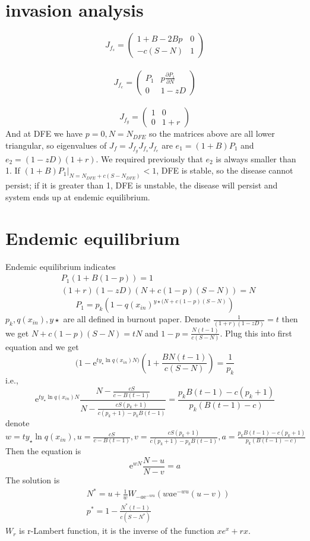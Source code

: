 \documentclass[12pt]{article}
\begin{document}
\section{invasion analysis}
$$
    J_{f_s}=\begin{pmatrix}
    1+B-2Bp&0\\-c(S-N)&1
\end{pmatrix}
$$\\
$$
    J_{f_e}=\begin{pmatrix}
P_1&p\frac{\partial P_1}{\partial N}\\0&1-zD
\end{pmatrix}$$
\\
$$
    J_{f_g}=\begin{pmatrix}
1&0\\0&1+r
\end{pmatrix}
$$
And at DFE we have $p=0,N=N_{DFE}$ so the matrices above are all lower triangular, so eigenvalues of $J_f=J_{f_g}J_{f_s}J_{f_e}$ 
are $e_1=(1+B)P_1$ and $e_2=(1-zD)(1+r)$. We required previously that $e_2$ is always smaller than 1. If $(1+B)P_1|_{N=N_{DFE}+c(S-N_{DFE})}<1$, DFE is stable, so the disease cannot persist; if it is greater than 1, DFE is unstable, the disease will persist and system ends up at endemic equilibrium.

\section{Endemic equilibrium}
Endemic equilibrium indicates
\begin{align*}
    &P_1(1+B(1-p))=1\\
    &(1+r)(1-zD)(N+c(1-p)(S-N))=N
\end{align*}
$$P_1=p_k(1-q(x_{in})^{y \star(N+c(1-p)(S-N)})$$
$p_k,q(x_{in}),y \star$ are all defined in burnout paper. Denote $\frac{1}{(1+r)(1-zD)}=t$ then we get $N+c(1-p)(S-N)=tN$ and $1-p=\frac{N(t-1)}{c(S-N)}$. Plug this into first equation and we get
$$(1-\mathrm{e}^{ty_\star \ln q(x_{in})N)}(1+\frac{BN(t-1)}{c(S-N)})=\frac{1}{p_k}$$
i.e.,
$$\mathrm{e}^{ty_\star \ln q(x_{in})N}\frac{N-\frac{cS}{c-B(t-1)}}{N-\frac{cS(p_k+1)}{c(p_k+1)-p_kB(t-1)}}=\frac{p_kB(t-1)-c(p_k+1)}{p_k(B(t-1)-c)}$$
denote $w=ty_\star \ln q(x_{in}),u=\frac{cS}{c-B(t-1)},v=\frac{cS(p_k+1)}{c(p_k+1)-p_kB(t-1)},a=\frac{p_kB(t-1)-c(p_k+1)}{p_k(B(t-1)-c)}$ 
Then the equation is
$$\mathrm{e}^{wN}\frac{N-u}{N-v}=a$$
The solution is 
\begin{align*}
&N^*=u+\frac{1}{w}W_{-a\mathrm{e}^{-wu}}(wa\mathrm{e}^{-wu}(u-v))\\
&p^*=1-\frac{N^*(t-1)}{c(S-N^*)}
\end{align*}
$W_r$ is r-Lambert function, it is the 
inverse of the function $xe^x + rx $.  
\end{document}
